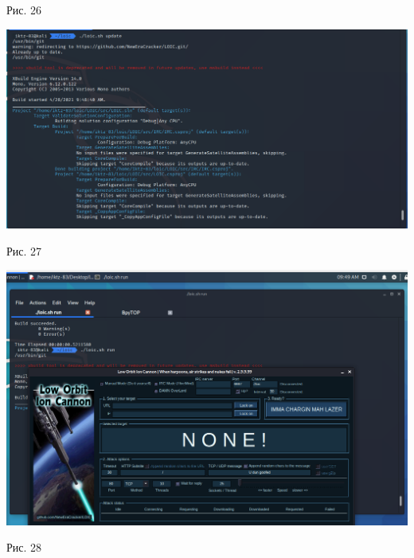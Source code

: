 \documentclass[a4paper,14pt]{extarticle}
\begin{document}
\begin{center}
        Рис. 26 

        \includegraphics[scale=0.4]{pics/27.png}

        Рис. 27 

        \includegraphics[scale=0.35]{pics/28.png}

        Рис. 28 

    \end{center}
    
\end{document}
